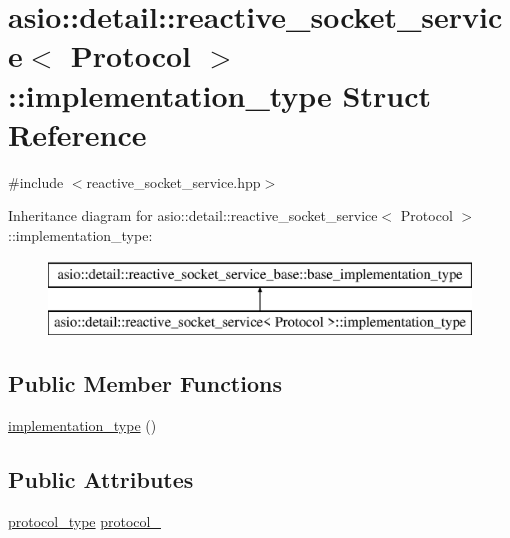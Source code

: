 \hypertarget{structasio_1_1detail_1_1reactive__socket__service_1_1implementation__type}{}\section{asio\+:\+:detail\+:\+:reactive\+\_\+socket\+\_\+service$<$ Protocol $>$\+:\+:implementation\+\_\+type Struct Reference}
\label{structasio_1_1detail_1_1reactive__socket__service_1_1implementation__type}


{\ttfamily \#include $<$reactive\+\_\+socket\+\_\+service.\+hpp$>$}

Inheritance diagram for asio\+:\+:detail\+:\+:reactive\+\_\+socket\+\_\+service$<$ Protocol $>$\+:\+:implementation\+\_\+type\+:\begin{figure}[H]
\begin{center}
\leavevmode
\includegraphics[height=2.000000cm]{structasio_1_1detail_1_1reactive__socket__service_1_1implementation__type}
\end{center}
\end{figure}
\subsection*{Public Member Functions}
\begin{DoxyCompactItemize}
\item 
\hyperlink{structasio_1_1detail_1_1reactive__socket__service_1_1implementation__type_a922a05a7a2ef3332d822a3484ebbb23b}{implementation\+\_\+type} ()
\end{DoxyCompactItemize}
\subsection*{Public Attributes}
\begin{DoxyCompactItemize}
\item 
\hyperlink{classasio_1_1detail_1_1reactive__socket__service_a622bd8618dbd40771a5b6a66eb1b75e9}{protocol\+\_\+type} \hyperlink{structasio_1_1detail_1_1reactive__socket__service_1_1implementation__type_a2758dd8a5ce0dee6fb61e2df2d50253d}{protocol\+\_\+}
\end{DoxyCompactItemize}


